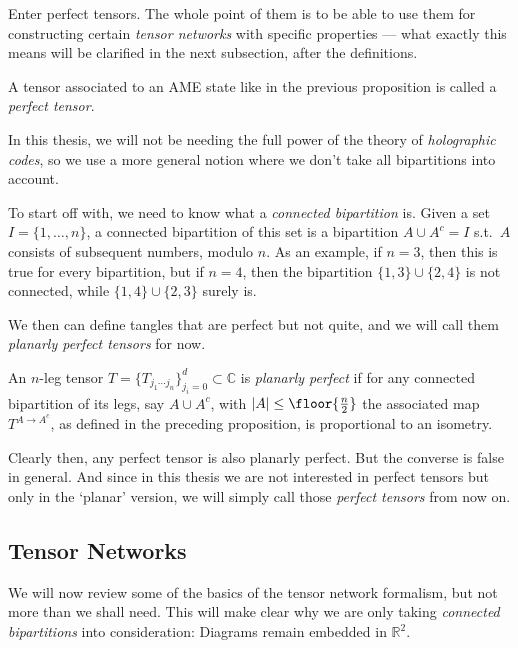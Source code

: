 \bigno
Enter perfect tensors. The whole point of them is to be able to use them for constructing certain \emph{tensor networks} with specific properties --- what exactly this means will be clarified in the next subsection, after the definitions.

\begin{definition}
A tensor associated to an AME state like in the previous proposition is called a \emph{perfect tensor}.
\end{definition}

In this thesis, we will not be needing the full power of the theory of \emph{holographic codes}, so we use a more general notion where we don't take all bipartitions into account. 

To start off with, we need to know what a \emph{connected bipartition} is. Given a set $I=\{1,\ldots, n\}$, a connected bipartition of this set is a bipartition $A\cup A^c=I$ s.t.\ $A$ consists of subsequent numbers, modulo $n$. As an example, if $n=3$, then this is true for every bipartition, but if $n=4$, then the bipartition $\{1,3\}\cup\{2,4\}$ is not connected, while $\{1,4\}\cup\{2,3\}$ surely is.

We then can define tangles that are perfect but not quite, and we will call them \emph{planarly perfect tensors} for now. 

\begin{definition}\label{def:planarly perfect tensor}
An $n$-leg tensor $T=\{T_{j_1\cdots j_n}\}_{j_i=0}^d\subset\mathbb{C}$ is \emph{planarly perfect} if for any connected bipartition of its legs, say $A\cup A^c$, with $\lvert A \rvert\leq \floor{\frac{n}{2}}$ the associated map
$T^{A\rightarrow A^c}$, as defined in the preceding proposition,
is proportional to an isometry.
\end{definition}
Clearly then, any perfect tensor is also planarly perfect. But the converse is false in general. And since in this thesis we are not interested in perfect tensors but only in the `planar' version, we will simply call those \emph{perfect tensors} from now on.


\subsection*{Tensor Networks}
We will now review some of the basics of the tensor network formalism, but not more than we shall need. This will make clear why we are only taking \emph{connected bipartitions} into consideration: Diagrams remain embedded in $\mathbb{R}^2$.

